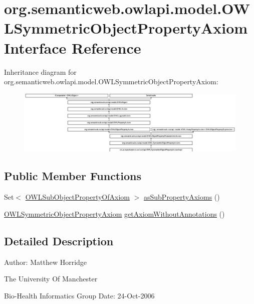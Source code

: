 \hypertarget{interfaceorg_1_1semanticweb_1_1owlapi_1_1model_1_1_o_w_l_symmetric_object_property_axiom}{\section{org.\-semanticweb.\-owlapi.\-model.\-O\-W\-L\-Symmetric\-Object\-Property\-Axiom Interface Reference}
\label{interfaceorg_1_1semanticweb_1_1owlapi_1_1model_1_1_o_w_l_symmetric_object_property_axiom}
}
Inheritance diagram for org.\-semanticweb.\-owlapi.\-model.\-O\-W\-L\-Symmetric\-Object\-Property\-Axiom\-:\begin{figure}[H]
\begin{center}
\leavevmode
\includegraphics[height=3.060109cm]{interfaceorg_1_1semanticweb_1_1owlapi_1_1model_1_1_o_w_l_symmetric_object_property_axiom}
\end{center}
\end{figure}
\subsection*{Public Member Functions}
\begin{DoxyCompactItemize}
\item 
Set$<$ \hyperlink{interfaceorg_1_1semanticweb_1_1owlapi_1_1model_1_1_o_w_l_sub_object_property_of_axiom}{O\-W\-L\-Sub\-Object\-Property\-Of\-Axiom} $>$ \hyperlink{interfaceorg_1_1semanticweb_1_1owlapi_1_1model_1_1_o_w_l_symmetric_object_property_axiom_af42bdaa781862a89a98e65c445cbceda}{as\-Sub\-Property\-Axioms} ()
\item 
\hyperlink{interfaceorg_1_1semanticweb_1_1owlapi_1_1model_1_1_o_w_l_symmetric_object_property_axiom}{O\-W\-L\-Symmetric\-Object\-Property\-Axiom} \hyperlink{interfaceorg_1_1semanticweb_1_1owlapi_1_1model_1_1_o_w_l_symmetric_object_property_axiom_afde3322d208b6bec1cda2594bd251cca}{get\-Axiom\-Without\-Annotations} ()
\end{DoxyCompactItemize}


\subsection{Detailed Description}
Author\-: Matthew Horridge\par
 The University Of Manchester\par
 Bio-\/\-Health Informatics Group Date\-: 24-\/\-Oct-\/2006 

